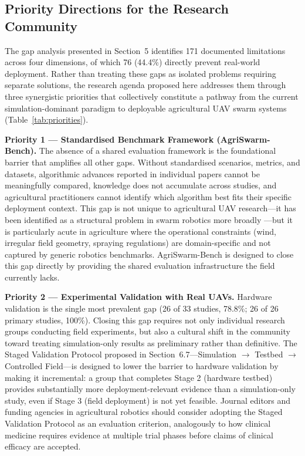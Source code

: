 \documentclass[review,3p,times]{elsarticle}
\begin{document}
\subsection{Priority Directions for the Research Community}

The gap analysis presented in Section~5 identifies 171 documented limitations across four dimensions, of which 76 (44.4\%) directly prevent real-world deployment. Rather than treating these gaps as isolated problems requiring separate solutions, the research agenda proposed here addresses them through three synergistic priorities that collectively constitute a pathway from the current simulation-dominant paradigm to deployable agricultural UAV swarm systems (Table~\ref{tab:priorities}).

\textbf{Priority 1 --- Standardised Benchmark Framework (AgriSwarm-Bench).} The absence of a shared evaluation framework is the foundational barrier that amplifies all other gaps. Without standardised scenarios, metrics, and datasets, algorithmic advances reported in individual papers cannot be meaningfully compared, knowledge does not accumulate across studies, and agricultural practitioners cannot identify which algorithm best fits their specific deployment context. This gap is not unique to agricultural UAV research---it has been identified as a structural problem in swarm robotics more broadly \cite{brambilla2013}---but it is particularly acute in agriculture where the operational constraints (wind, irregular field geometry, spraying regulations) are domain-specific and not captured by generic robotics benchmarks. AgriSwarm-Bench is designed to close this gap directly by providing the shared evaluation infrastructure the field currently lacks.

\textbf{Priority 2 --- Experimental Validation with Real UAVs.} Hardware validation is the single most prevalent gap (26 of 33 studies, 78.8\%; 26 of 26 primary studies, 100\%). Closing this gap requires not only individual research groups conducting field experiments, but also a cultural shift in the community toward treating simulation-only results as preliminary rather than definitive. The Staged Validation Protocol proposed in Section~6.7---Simulation $\rightarrow$ Testbed $\rightarrow$ Controlled Field---is designed to lower the barrier to hardware validation by making it incremental: a group that completes Stage 2 (hardware testbed) provides substantially more deployment-relevant evidence than a simulation-only study, even if Stage 3 (field deployment) is not yet feasible. Journal editors and funding agencies in agricultural robotics should consider adopting the Staged Validation Protocol as an evaluation criterion, analogously to how clinical medicine requires evidence at multiple trial phases before claims of clinical efficacy are accepted.
\end{document}
